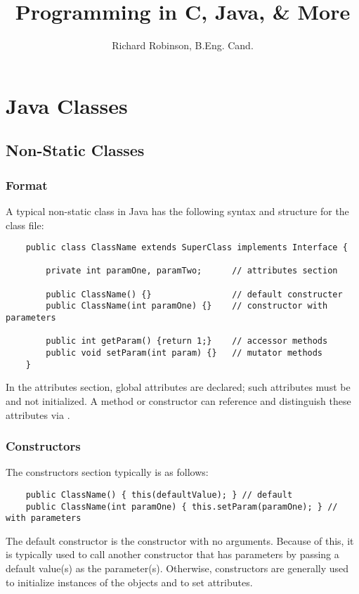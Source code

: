 \documentclass[oneside,11pt]{book}
\title{\Huge{\textbf{Programming in C, Java, \& More}}}
\author{Richard Robinson, B.Eng. Cand.}
\begin{document}
\maketitle
\tableofcontents
\setlength{\parindent}{0pt}

\chapter{Java Classes}

\section{Non-Static Classes}

\subsection{Format}

A typical non-static class in Java has the following syntax and structure for the class file:
\begin{verbatim}
    public class ClassName extends SuperClass implements Interface {

        private int paramOne, paramTwo;      // attributes section

        public ClassName() {}                // default constructer
        public ClassName(int paramOne) {}    // constructor with parameters

        public int getParam() {return 1;}    // accessor methods
        public void setParam(int param) {}   // mutator methods
    }
\end{verbatim}

In the attributes section, global attributes are declared; such attributes must be  and not initialized. A method or constructor can reference and distinguish these attributes via .

\subsection{Constructors}

The constructors section typically is as follows:
\begin{verbatim}
    public ClassName() { this(defaultValue); } // default
    public ClassName(int paramOne) { this.setParam(paramOne); } // with parameters
\end{verbatim}
The default constructor is the constructor with no arguments. Because of this, it is typically used to call another constructor that has parameters by passing a default value(s) as the parameter(s). Otherwise, constructors are generally used to initialize instances of the objects and to set attributes.
\end{document}
